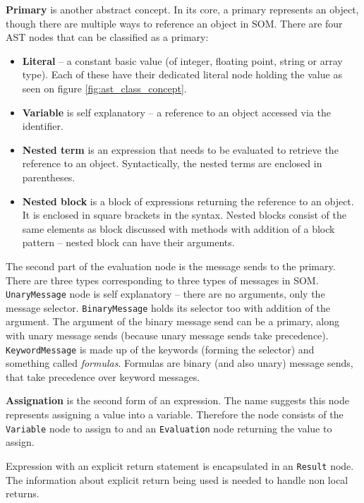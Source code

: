 \documentclass[thesis=M,english]{FITthesis}[2019/12/23]
\begin{document}
\textbf{Primary} is another abstract concept. In its core, a primary represents an object, though there are multiple ways to reference an object in SOM.
There are four AST nodes that can be classified as a primary:
\begin{itemize}
	\item \textbf{Literal} -- a constant basic value (of integer, floating point, string or array type). Each of these have their dedicated literal node
		holding the value as seen on figure \ref{fig:ast_class_concept}.
	\item \textbf{Variable} is self explanatory -- a reference to an object accessed via the identifier.
	\item \textbf{Nested term} is an expression that needs to be evaluated to retrieve the reference to an object. Syntactically, the nested terms
		are enclosed in parentheses.
	\item \textbf{Nested block} is a block of expressions returning the reference to an object. It is enclosed in square brackets in the syntax.
		Nested blocks consist of the same elements as block discussed with methods with addition of a block pattern -- nested block can have their arguments. %
\end{itemize}

The second part of the evaluation node is the message sends to the primary. There are three types corresponding to three types of messages in SOM.
\texttt{UnaryMessage} node is self explanatory -- there are no arguments, only the message selector. \texttt{BinaryMessage} holds its selector too
with addition of the argument. The argument of the binary message send can be a primary, along with unary message sends (because unary message sends take
precedence). \texttt{KeywordMessage} is made up of the keywords (forming the selector) and something called \textit{formulas}. Formulas are binary (and also unary) message
sends, that take precedence over keyword messages.

\textbf{Assignation} is the second form of an expression. The name suggests this node represents assigning a value into a variable. Therefore the node consists
of the \texttt{Variable} node to assign to and an \texttt{Evaluation} node returning the value to assign.

Expression with an explicit return statement is encapsulated in an \texttt{Result} node. The information about explicit return being used is needed
to handle non local returns.
\end{document}
